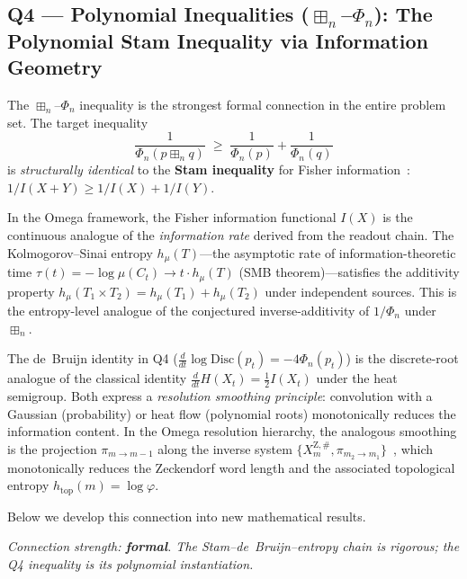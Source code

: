 \subsection{Q4 --- Polynomial Inequalities ($\boxplus_n$--$\Phi_n$):
  The Polynomial Stam Inequality via Information Geometry}
\label{ss:omega-q4}

\begin{remark}
The $\boxplus_n$--$\Phi_n$ inequality is the strongest formal
connection in the entire problem set.  The target inequality
\[
\frac{1}{\Phi_n(p\boxplus_n q)}
\;\ge\;
\frac{1}{\Phi_n(p)}+\frac{1}{\Phi_n(q)}
\]
is \emph{structurally identical} to the \textbf{Stam inequality}
for Fisher information~\cite{stam1959,costa1985}:
$1/I(X+Y)\ge 1/I(X)+1/I(Y)$.

In the Omega framework, the Fisher information functional $I(X)$
is the continuous analogue of the \emph{information rate}
derived from the readout chain.
The Kolmogorov--Sinai entropy $h_\mu(T)$---the asymptotic rate of
information-theoretic time $\tau(t)=-\log\mu(C_t)\to t\cdot h_\mu(T)$
(SMB theorem)---satisfies the additivity property
$h_\mu(T_1\times T_2)=h_\mu(T_1)+h_\mu(T_2)$ under independent
sources.  This is the entropy-level analogue of the conjectured
inverse-additivity of $1/\Phi_n$ under $\boxplus_n$.

The de~Bruijn identity in Q4
($\tfrac{d}{dt}\log\mathrm{Disc}(p_t)=-4\Phi_n(p_t)$)
is the discrete-root analogue of the classical identity
$\tfrac{d}{dt}H(X_t)=\tfrac12 I(X_t)$ under the heat semigroup.
Both express a \emph{resolution smoothing principle}: convolution
with a Gaussian (probability) or heat flow (polynomial roots)
monotonically reduces the information content.
In the Omega resolution hierarchy, the analogous smoothing is
the projection $\pi_{m\to m-1}$ along the inverse system
$\{X_m^{\mathrm Z,\#},\pi_{m_2\to m_1}\}$~\cite{omega-fop},
which monotonically reduces the Zeckendorf word length and the
associated topological entropy $h_{\mathrm{top}}(m)=\log\varphi$.

Below we develop this connection into new mathematical results.

\emph{Connection strength: \textbf{formal}.  The Stam--de~Bruijn--entropy
chain is rigorous; the Q4 inequality is its polynomial instantiation.}
\end{remark}

